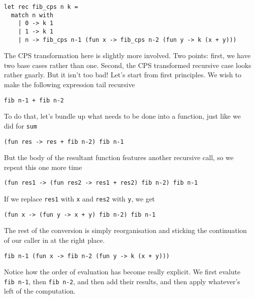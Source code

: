 \begin{code}
\label{code:fib-ocaml-again}
\begin{verbatim}
let rec fib_cps n k = 
  match n with
    | 0 -> k 1
    | 1 -> k 1
    | n -> fib_cps n-1 (fun x -> fib_cps n-2 (fun y -> k (x + y)))
\end{verbatim}
\end{code}

The CPS transformation here is slightly more involved. Two points: first, we have two base cases rather than one. Second, the CPS transformed recursive case looks rather gnarly. But it isn't too bad! Let's start from first principles. We wish to make the following expression tail recursive 

\begin{verbatim}
fib n-1 + fib n-2
\end{verbatim}
To do that, let's bundle up what needs to be done into a function, just like we did for \texttt{sum}
\begin{verbatim}
(fun res -> res + fib n-2) fib n-1 
\end{verbatim}
But the body of the resultant function features another recursive call, so we repeat this one more time
\begin{verbatim}
(fun res1 -> (fun res2 -> res1 + res2) fib n-2) fib n-1 
\end{verbatim}
If we replace \texttt{res1} with \texttt{x} and \texttt{res2} with \texttt{y}, we get
\begin{verbatim}
(fun x -> (fun y -> x + y) fib n-2) fib n-1 
\end{verbatim}
The rest of the conversion is simply reorganisation and sticking the continuation of our caller in at the right place.
\begin{verbatim}
fib n-1 (fun x -> fib n-2 (fun y -> k (x + y))) 
\end{verbatim}
Notice how the order of evaluation has become really explicit. We first evalute \texttt{fib n-1}, then \texttt{fib n-2}, and then add their results, and then apply whatever's left of the computation. 

